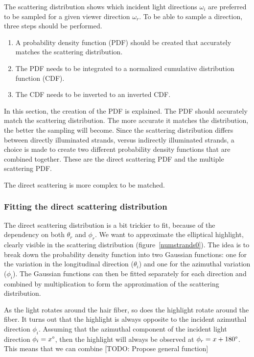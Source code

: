 \documentclass[11pt,a4paper]{report}
\begin{document}
The scattering distribution shows which incident light directions $\omega_i$ are preferred to be sampled for a given viewer direction $\omega_r$. To be able to sample a direction, three steps should be performed. 

\begin{enumerate}
\item A probability density function (PDF) should be created that accurately matches the scattering distribution.
\item The PDF needs to be integrated to a normalized cumulative distribution function (CDF).
\item The CDF needs to be inverted to an inverted CDF.
\end{enumerate}

In this section, the creation of the PDF is explained. The PDF should  accurately match the scattering distribution. The more accurate it matches the distribution, the better the sampling will become. Since the scattering distribution differs between directly illuminated strands, versus indirectly illuminated strands, a choice is made to create two different probability density functions that are combined together. These are the direct scattering PDF and the multiple scattering PDF.



 The direct scattering is more complex to be matched. 

\subsubsection{Fitting the direct scattering distribution}

The direct scattering distribution is a bit trickier to fit, because of the dependency on both $\theta_r$ and $\phi_r$. We want to approximate the elliptical highlight, clearly visible in the scattering distribution (figure~\ref{numstrands0}). The idea is to break down the probability density function into two Gaussian functions: one for the variation in the longitudinal direction ($\theta_i$) and one for the azimuthal variation ($\phi_i$). The Gaussian functions can then be fitted separately for each direction and combined by multiplication to form the approximation of the scattering distribution.

As the light rotates around the hair fiber, so does the highlight rotate around the fiber. It turns out that the highlight is always opposite to the incident azimuthal direction $\phi_i$. Assuming that the azimuthal component of the incident light direction $\phi_i = x\degree$, then the highlight will always be observed at $\phi_r = x+180\degree$. This means that we can combine 
[TODO: Propose general function]
\end{document}
